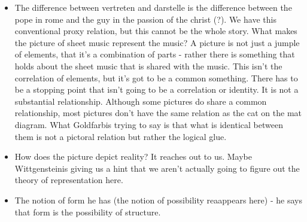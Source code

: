 \documentclass[12pt]{article}
\theoremstyle{definition}
\newcommand{\w}{Wittgenstein}
\newcommand{\g}{Goldfarb}
\begin{document}
\begin{itemize}
    \item The difference between vertreten and darstelle is the difference between the pope in rome and the guy in the passion of the christ (?). We have this conventional proxy relation, but this cannot be the whole story. What makes the picture of sheet music represent the music? A picture is not just a jumple of elements, that it's a combination of parts - rather there is something that holds about the sheet music that is shared with the music. This isn't the correlation of elements, but it's got to be a common something. There has to be a stopping point that isn't going to be a correlation or identity. It is not a substantial relationship. Although some pictures do share a common relationship, most pictures don't have the same relation as the cat on the mat diagram. What \g is trying to say is that what is identical between them is not a pictoral relation but rather the logical glue.
    \item How does the picture depict reality? It reaches out to us. Maybe \w is giving us a hint that we aren't actually going to figure out the theory of representation here.
    \item The notion of form he has (the notion of possibility reaappears here) - he says that form is the possibility of structure.
\end{itemize}
\end{document}
